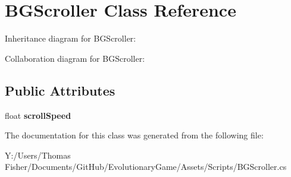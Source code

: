 \hypertarget{class_b_g_scroller}{}\section{B\+G\+Scroller Class Reference}
\label{class_b_g_scroller}


Inheritance diagram for B\+G\+Scroller\+:


Collaboration diagram for B\+G\+Scroller\+:
\subsection*{Public Attributes}
\begin{DoxyCompactItemize}
\item 
\mbox{\label{class_b_g_scroller_a31ae764c810451258f69c9e15def429f}} 
float {\bfseries scroll\+Speed}
\end{DoxyCompactItemize}


The documentation for this class was generated from the following file\+:\begin{DoxyCompactItemize}
\item 
Y\+:/\+Users/\+Thomas Fisher/\+Documents/\+Git\+Hub/\+Evolutionary\+Game/\+Assets/\+Scripts/B\+G\+Scroller.\+cs\end{DoxyCompactItemize}

